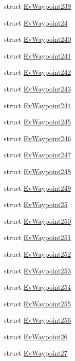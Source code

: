 \begin{DoxyCompactItemize}
struct \hyperlink{structcl__move__base__z_1_1EvWaypoint239}{Ev\+Waypoint239}
\item 
struct \hyperlink{structcl__move__base__z_1_1EvWaypoint24}{Ev\+Waypoint24}
\item 
struct \hyperlink{structcl__move__base__z_1_1EvWaypoint240}{Ev\+Waypoint240}
\item 
struct \hyperlink{structcl__move__base__z_1_1EvWaypoint241}{Ev\+Waypoint241}
\item 
struct \hyperlink{structcl__move__base__z_1_1EvWaypoint242}{Ev\+Waypoint242}
\item 
struct \hyperlink{structcl__move__base__z_1_1EvWaypoint243}{Ev\+Waypoint243}
\item 
struct \hyperlink{structcl__move__base__z_1_1EvWaypoint244}{Ev\+Waypoint244}
\item 
struct \hyperlink{structcl__move__base__z_1_1EvWaypoint245}{Ev\+Waypoint245}
\item 
struct \hyperlink{structcl__move__base__z_1_1EvWaypoint246}{Ev\+Waypoint246}
\item 
struct \hyperlink{structcl__move__base__z_1_1EvWaypoint247}{Ev\+Waypoint247}
\item 
struct \hyperlink{structcl__move__base__z_1_1EvWaypoint248}{Ev\+Waypoint248}
\item 
struct \hyperlink{structcl__move__base__z_1_1EvWaypoint249}{Ev\+Waypoint249}
\item 
struct \hyperlink{structcl__move__base__z_1_1EvWaypoint25}{Ev\+Waypoint25}
\item 
struct \hyperlink{structcl__move__base__z_1_1EvWaypoint250}{Ev\+Waypoint250}
\item 
struct \hyperlink{structcl__move__base__z_1_1EvWaypoint251}{Ev\+Waypoint251}
\item 
struct \hyperlink{structcl__move__base__z_1_1EvWaypoint252}{Ev\+Waypoint252}
\item 
struct \hyperlink{structcl__move__base__z_1_1EvWaypoint253}{Ev\+Waypoint253}
\item 
struct \hyperlink{structcl__move__base__z_1_1EvWaypoint254}{Ev\+Waypoint254}
\item 
struct \hyperlink{structcl__move__base__z_1_1EvWaypoint255}{Ev\+Waypoint255}
\item 
struct \hyperlink{structcl__move__base__z_1_1EvWaypoint256}{Ev\+Waypoint256}
\item 
struct \hyperlink{structcl__move__base__z_1_1EvWaypoint26}{Ev\+Waypoint26}
\item 
struct \hyperlink{structcl__move__base__z_1_1EvWaypoint27}{Ev\+Waypoint27}

\end{DoxyCompactItemize}
